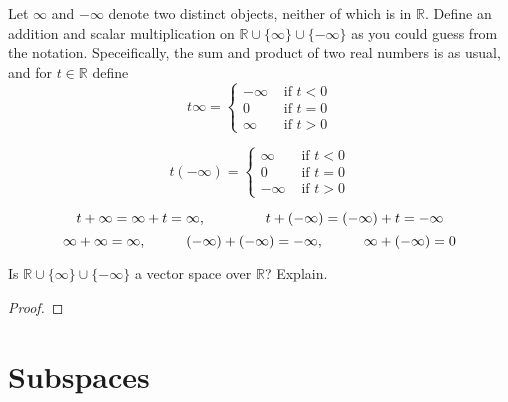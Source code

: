 \begin{exercise} \label{1.B.6}
    Let \( \infty \) and \( -\infty \) denote two distinct objects, neither of which is in \( \mathbb{R} \). Define an addition and scalar multiplication on \( \mathbb{R} \cup \{\infty\} \cup \{-\infty\} \) as you could guess from the notation. Speceifically, the sum and product of two real numbers is as usual, and for \( t \in \mathbb{R} \) define
    \[
    t \infty = 
    \begin{cases}
    -\infty & \text{ if } t < 0 \\
    0 & \text{ if } t = 0 \\
    \infty & \text{ if } t > 0
    \end{cases}
    \]
    
    \[
    t(-\infty) = 
    \begin{cases}
    \infty & \text{ if } t < 0 \\
    0 & \text{ if } t = 0 \\
    -\infty & \text{ if } t > 0
    \end{cases}
    \]
    
    \[t + \infty = \infty + t = \infty, \hspace{15mm} t + (-\infty) = (-\infty) + t = -\infty \]
    \[\infty + \infty = \infty, \hspace{10mm} (-\infty) + (-\infty) = -\infty, \hspace{10mm} \infty + (-\infty) = 0 \]
    
    Is \( \mathbb{R} \cup \{\infty\}  \cup \{-\infty\} \) a vector space over \( \mathbb{R} \)? Explain.
    
    \begin{proof}
        
    \end{proof}
\end{exercise}

\section{\label{1.C} Subspaces}

\begin{exercise} \label{1.C.1}
    
\end{exercise}

\begin{exercise} \label{1.C.2}
    
\end{exercise}

\begin{exercise} \label{1.C.3}
    
\end{exercise}

